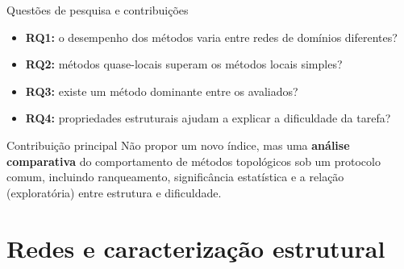 \documentclass[aspectratio=169,11pt]{beamer}
\providecommand{\EspacoAposTitulo}{\vspace*{0.93cm}}
\providecommand{\EspacoEntreTopicos}{0.29cm}
\newcommand{\dest}[1]{\textcolor{modTeal}{\textbf{#1}}}
\begin{document}
\begin{frame}[t]{Questões de pesquisa e contribuições}

  \EspacoAposTitulo

  \begin{itemize}
    \setlength{\itemsep}{\EspacoEntreTopicos}

    \item \textbf{RQ1:} o desempenho dos métodos varia entre redes de
    domínios diferentes?
    \item \textbf{RQ2:} métodos quase-locais superam os métodos locais
    simples?
    \item \textbf{RQ3:} existe um método dominante entre os avaliados?
    \item \textbf{RQ4:} propriedades estruturais ajudam a explicar a
    dificuldade da tarefa?

  \end{itemize}

  \vspace{0.30cm}
  \begin{block}{Contribuição principal}
    Não propor um novo índice, mas uma \dest{análise comparativa}
    do comportamento de métodos topológicos sob um protocolo comum,
    incluindo ranqueamento, significância estatística e a relação
    (exploratória) entre estrutura e dificuldade.
  \end{block}

\end{frame}

\section{Redes e caracterização estrutural}
\end{document}
